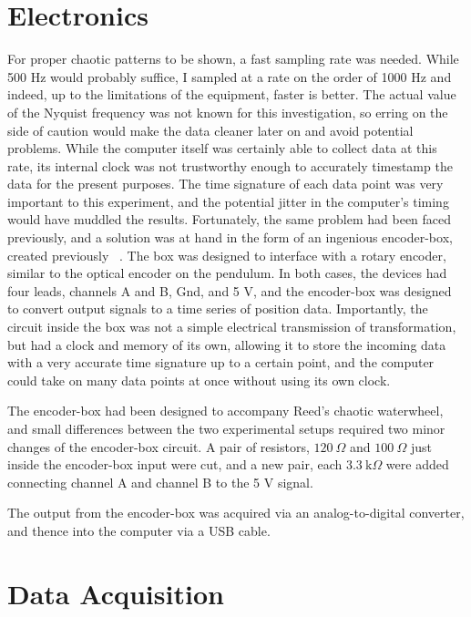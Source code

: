 \documentclass[12pt,twoside]{reedthesis}
\begin{document}
\section{Electronics}
For proper chaotic patterns to be shown, a fast sampling rate was needed.  While 500 Hz would probably suffice, I sampled at a rate on the order of 1000 Hz and indeed, up to the limitations of the equipment, faster is better.  The actual value of the Nyquist frequency was not known for this investigation, so erring on the side of caution would make the data cleaner later on and avoid potential problems.  While the computer itself was certainly able to collect data at this rate, its internal clock was not trustworthy enough to accurately timestamp the data for the present purposes.  The time signature of each data point was very important to this experiment, and the potential jitter in the computer's timing would have muddled the results.  Fortunately, the same problem had been faced previously, and a solution was at hand in the form of an ingenious encoder-box, created previously ~\cite{illing_in_press,fordyce2009}.  The box was designed to interface with a rotary encoder, similar to the optical encoder on the pendulum.  In both cases, the devices had four leads, channels A and B, Gnd, and 5 V, and the encoder-box was designed to convert output signals to a time series of position data.  Importantly, the circuit inside the box was not a simple electrical transmission of transformation, but had a clock and memory of its own, allowing it to store the incoming data with a very accurate time signature up to a certain point, and the computer could take on many data points at once without using its own clock.  

The encoder-box had been designed to accompany Reed's chaotic waterwheel, and small differences between the two experimental setups required two minor changes of the encoder-box circuit.  A pair of resistors, $120~\Omega$ and $100~\Omega$ just inside the encoder-box input were cut, and a new pair, each $3.3~\text{k}\Omega$ were added connecting channel A and channel B to the 5 V signal.  


The output from the encoder-box was acquired via an analog-to-digital converter, and thence into the computer via a USB cable.  

\clearpage

\section{Data Acquisition}
\end{document}

